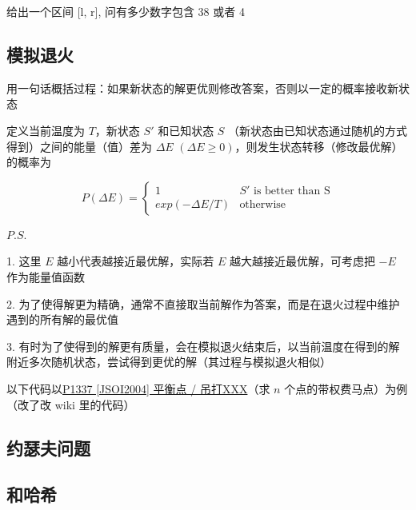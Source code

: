 \documentclass[12pt]{article}
\begin{document}
给出一个区间 [l, r], 问有多少数字包含 38 或者 4



\newpage

\subsection{模拟退火}

    \hspace{2em} 用一句话概括过程：如果新状态的解更优则修改答案，否则以一定的概率接收新状态

    \hspace{2em} 定义当前温度为 $T$，新状态 $S'$ 和已知状态 $S$ （新状态由已知状态通过随机的方式得到）之间的能量（值）差为 $\Delta E$ $(\Delta E\ge0)$，则发生状态转移（修改最优解）的概率为

$$
P(\Delta E)=
\begin{cases}
	1 & S'\text{ is better than S}\\
	exp(-\Delta E/T) & \text{otherwise}
\end{cases}
$$

$P.S.$ 

    \hspace{2em} 1. 这里 $E$ 越小代表越接近最优解，实际若 $E$ 越大越接近最优解，可考虑把 $-E$ 作为能量值函数

    \hspace{2em} 2. 为了使得解更为精确，通常不直接取当前解作为答案，而是在退火过程中维护遇到的所有解的最优值

    \hspace{2em} 3. 有时为了使得到的解更有质量，会在模拟退火结束后，以当前温度在得到的解附近多次随机状态，尝试得到更优的解（其过程与模拟退火相似）

    \hspace{2em} 以下代码以\href{https://www.luogu.com.cn/problem/P1337}{P1337 [JSOI2004] 平衡点 / 吊打XXX}（求 $n$ 个点的带权费马点）为例（改了改 wiki 里的代码）



\subsection{约瑟夫问题}



\newpage

\subsection{和哈希}
\end{document}

